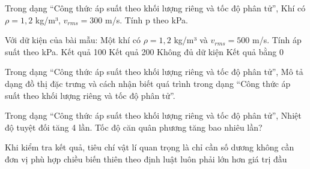 \begin{ex}
Trong dạng “Công thức áp suất theo khối lượng riêng và tốc độ phân tử”, Khí có $\rho=1,2$ kg/m³, $v_{rms}=300$ m/s. Tính p theo kPa.
\end{ex}

\begin{ex}
Với dữ kiện của bài mẫu: Một khí có $\rho=1,2$ kg/m³ và $v_{rms}=500$ m/s. Tính áp suất theo kPa.
\choice
{\True Kết quả 100}
{Kết quả 200}
{Không đủ dữ kiện}
{Kết quả bằng 0}
\end{ex}

\begin{ex}
Trong dạng “Công thức áp suất theo khối lượng riêng và tốc độ phân tử”, Mô tả dạng đồ thị đặc trưng và cách nhận biết quá trình trong dạng “Công thức áp suất theo khối lượng riêng và tốc độ phân tử”.
\choiceTF

\end{ex}

\begin{ex}
Trong dạng “Công thức áp suất theo khối lượng riêng và tốc độ phân tử”, Nhiệt độ tuyệt đối tăng 4 lần. Tốc độ căn quân phương tăng bao nhiêu lần?
\end{ex}

\begin{ex}
Khi kiểm tra kết quả, tiêu chí vật lí quan trọng là
\choice
{chỉ cần số dương}
{không cần đơn vị}
{\True phù hợp chiều biến thiên theo định luật}
{luôn phải lớn hơn giá trị đầu}
\end{ex}

